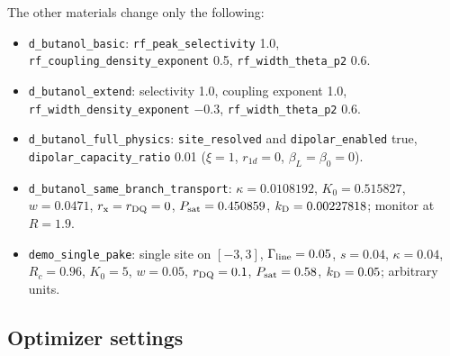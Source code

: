 \documentclass[11pt]{article}
\newcommand{\code}[1]{\texttt{#1}}
\begin{document}
\noindent The other materials change only the following:
\begin{itemize}
\item \code{d\_butanol\_basic}: \code{rf\_peak\_selectivity} 1.0, \code{rf\_coupling\_density\_exponent} 0.5, \code{rf\_width\_theta\_p2} 0.6.
\item \code{d\_butanol\_extend}: selectivity 1.0, coupling exponent 1.0, \code{rf\_width\_density\_exponent} \(-0.3\), \code{rf\_width\_theta\_p2} 0.6.
\item \code{d\_butanol\_full\_physics}: \code{site\_resolved} and \code{dipolar\_enabled} true, \code{dipolar\_capacity\_ratio} 0.01 (\(\xi=1\), \(r_{1d}=0\), \(\beta_L=\beta_0=0\)).
\item \code{d\_butanol\_same\_branch\_transport}: \(\kappa=0.0108192\), \(K_0=0.515827\), \(w=0.0471\), \(r_{\rm x}=r_{\rm DQ}=0\), \(P_{\rm sat}=0.450859\), \(k_{\rm D}=0.00227818\); monitor at \(R=1.9\).
\item \code{demo\_single\_pake}: single site on \([-3,3]\), \(\Gamma_{\rm line}=0.05\), \(s=0.04\), \(\kappa=0.04\), \(R_c=0.96\), \(K_0=5\), \(w=0.05\), \(r_{\rm DQ}=0.1\), \(P_{\rm sat}=0.58\), \(k_{\rm D}=0.05\); arbitrary units.
\end{itemize}

\subsection{Optimizer settings}
\end{document}
